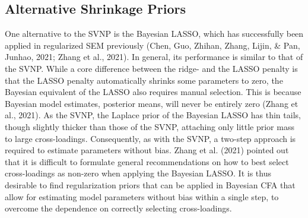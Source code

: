 \documentclass[
  man, donotrepeattitle,floatsintext]{apa6}
\begin{document}
\hypertarget{alternative-shrinkage-priors}{%
\subsection{Alternative Shrinkage Priors}\label{alternative-shrinkage-priors}}

One alternative to the SVNP is the Bayesian LASSO, which has successfully been applied in regularized SEM previously (Chen, Guo, Zhihan, Zhang, Lijin, \& Pan, Junhao, 2021; Zhang et al., 2021). In general, its performance is similar to that of the SVNP. While a core difference between the ridge- and the LASSO penalty is that the LASSO penalty automatically shrinks some parameters to zero, the Bayesian equivalent of the LASSO also requires manual selection. This is because Bayesian model estimates, posterior means, will never be entirely zero (Zhang et al., 2021). As the SVNP, the Laplace prior of the Bayesian LASSO has thin tails, though slightly thicker than those of the SVNP, attaching only little prior mass to large cross-loadings. Consequently, as with the SVNP, a two-step approach is required to estimate parameters without bias. Zhang et al. (2021) pointed out that it is difficult to formulate general recommendations on how to best select cross-loadings as non-zero when applying the Bayesian LASSO. It is thus desirable to find regularization priors that can be applied in Bayesian CFA that allow for estimating model parameters without bias within a single step, to overcome the dependence on correctly selecting cross-loadings.
\end{document}
